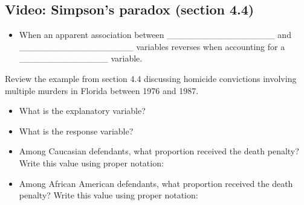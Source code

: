 \documentclass[
]{report}
\providecommand{\tightlist}{%
  \setlength{\itemsep}{0pt}\setlength{\parskip}{0pt}}
\begin{document}
\vspace{0.2in}

\subsection*{Video: Simpson's paradox (section 4.4)}\label{video-simpsons-paradox-section-4.4}


\begin{itemize}
\tightlist
\item
  When an apparent association between \_\_\_\_\_\_\_\_\_\_\_\_\_\_\_\_\_ and \_\_\_\_\_\_\_\_\_\_\_\_\_\_\_\_\_\_ variables reverses when accounting for a \_\_\_\_\_\_\_\_\_\_\_\_\_\_ variable.
\end{itemize}


Review the example from section 4.4 discussing homicide convictions involving multiple murders in Florida between 1976 and 1987.

\begin{itemize}
\tightlist
\item
  What is the explanatory variable?
\end{itemize}

\vspace{0.3in}

\begin{itemize}
\tightlist
\item
  What is the response variable?
\end{itemize}

\vspace{0.3in}

\begin{itemize}
\tightlist
\item
  Among Caucasian defendants, what proportion received the death penalty? Write this value using proper notation:
\end{itemize}

\vspace{0.3in}

\begin{itemize}
\tightlist
\item
  Among African American defendants, what proportion received the death penalty? Write this value using proper notation:
\end{itemize}

\vspace{0.3in}
\end{document}
